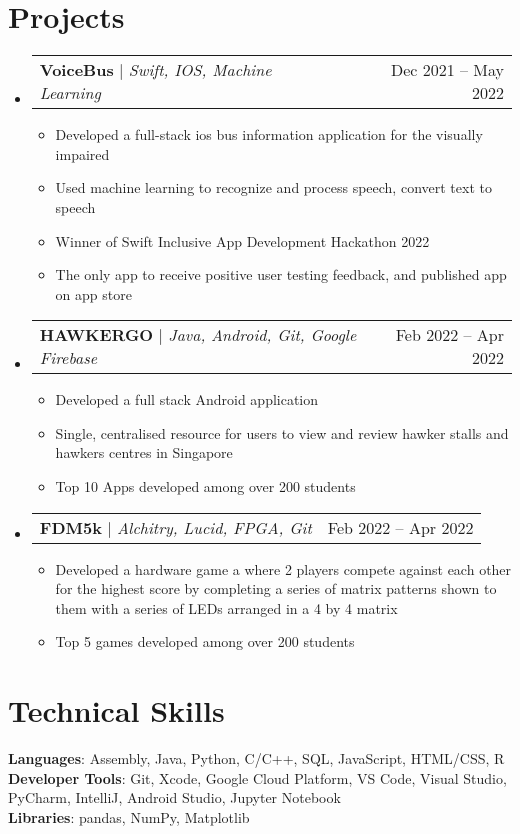 \documentclass[letterpaper,11pt]{article}
\makeatletter
\newcommand{\resumeItem}[1]{
  \item\small{
    {#1 \vspace{-2pt}}
  }
}
\newcommand{\resumeProjectHeading}[2]{
    \item
    \begin{tabular*}{0.97\textwidth}{l@{\extracolsep{\fill}}r}
      \small#1 & #2 \\
    \end{tabular*}\vspace{-7pt}
}
\newcommand{\resumeSubHeadingListStart}{\begin{itemize}[leftmargin=0.15in, label={}]}
\newcommand{\resumeSubHeadingListEnd}{\end{itemize}}
\newcommand{\resumeItemListStart}{\begin{itemize}}
\newcommand{\resumeItemListEnd}{\end{itemize}\vspace{-5pt}}
\makeatother
\begin{document}
\section{Projects}
    \resumeSubHeadingListStart
      \resumeProjectHeading
          {\textbf{VoiceBus} $|$ \emph{Swift, IOS, Machine Learning}}{Dec 2021 -- May 2022}
          \resumeItemListStart
            \resumeItem{Developed a full-stack ios bus information application for the visually impaired }
            \resumeItem{Used machine learning to recognize and process speech, convert text to speech}
            \resumeItem{Winner of Swift Inclusive App Development Hackathon 2022}
            \resumeItem{The only app to receive positive user testing feedback, and published app on app store}
          \resumeItemListEnd
      \resumeProjectHeading
          {\textbf{HAWKERGO} $|$ \emph{Java, Android, Git, Google Firebase}}{Feb 2022 -- Apr 2022}
          \resumeItemListStart
            \resumeItem{Developed a full stack Android application}
            \resumeItem{Single, centralised resource for users to view and review hawker stalls and hawkers centres in Singapore}
            \resumeItem{Top 10 Apps developed among over 200 students}
          \resumeItemListEnd
       \resumeProjectHeading
          {\textbf{FDM5k} $|$ \emph{Alchitry, Lucid, FPGA, Git}}{Feb 2022 -- Apr 2022}
          \resumeItemListStart
            \resumeItem{Developed a hardware game a where 2 players compete against each other for the highest score by completing a series of matrix patterns shown to them with a series of LEDs arranged in a 4 by 4 matrix}
            \resumeItem{Top 5 games developed among over 200 students}
          \resumeItemListEnd
    \resumeSubHeadingListEnd



%
\section{Technical Skills}
 \begin{itemize}[leftmargin=0.15in, label={}]
    \small{\item{
     \textbf{Languages}{: Assembly, Java, Python, C/C++, SQL, JavaScript, HTML/CSS, R} \\
     \textbf{Developer Tools}{: Git, Xcode, Google Cloud Platform, VS Code, Visual Studio, PyCharm, IntelliJ, Android Studio, Jupyter Notebook} \\
     \textbf{Libraries}{: pandas, NumPy, Matplotlib}
    }}
 \end{itemize}
\end{document}
